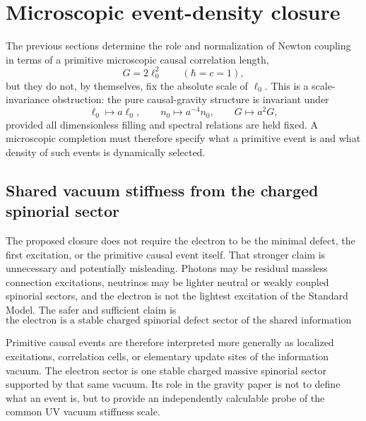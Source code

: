 \documentclass[11pt]{article}
\begin{document}
\section{Microscopic event-density closure}
\label{sec:event-density-closure}

The previous sections determine the role and normalization of Newton coupling in terms of a primitive microscopic causal correlation length,
\begin{equation}
G=2\ell_0^2\qquad (\hbar=c=1),
\end{equation}
but they do not, by themselves, fix the absolute scale of $\ell_0$. This is a scale-invariance obstruction: the pure causal-gravity structure is invariant under
\begin{equation}
\ell_0\mapsto a\ell_0,
\qquad
n_0\mapsto a^{-4}n_0,
\qquad
G\mapsto a^2G,
\end{equation}
provided all dimensionless filling and spectral relations are held fixed. A microscopic completion must therefore specify what a primitive event is and what density of such events is dynamically selected.

\subsection{Shared vacuum stiffness from the charged spinorial sector}

The proposed closure does not require the electron to be the minimal defect, the first excitation, or the primitive causal event itself. That stronger claim is unnecessary and potentially misleading. Photons may be residual massless connection excitations, neutrinos may be lighter neutral or weakly coupled spinorial sectors, and the electron is not the lightest excitation of the Standard Model. The safer and sufficient claim is
\begin{equation}
\boxed{
\text{the electron is a stable charged spinorial defect sector of the shared information vacuum, not necessarily the minimal defect.}
}
\end{equation}

Primitive causal events are therefore interpreted more generally as localized excitations, correlation cells, or elementary update sites of the information vacuum. The electron sector is one stable charged massive spinorial sector supported by that same vacuum. Its role in the gravity paper is not to define what an event is, but to provide an independently calculable probe of the common UV vacuum stiffness scale.
\end{document}
